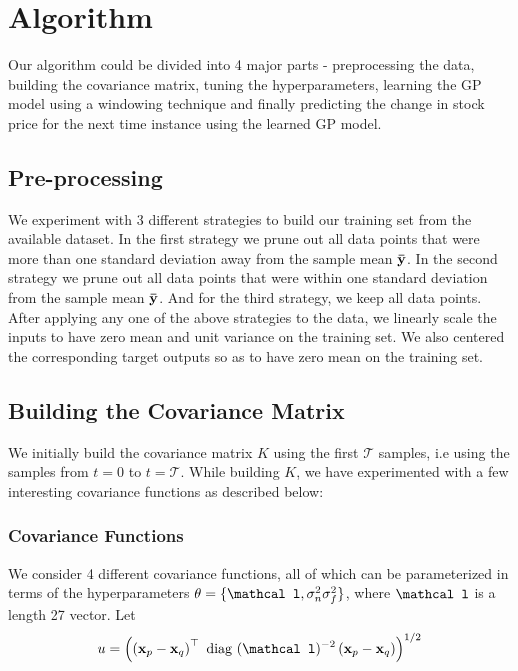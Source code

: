 \documentclass{article} %
\def\bfx{\mathbf x}
\def\bftheta{\mathbf \theta}
\def\bfl{\mathbf \mathcal l}
\def\diag{\mbox{ diag }}
\begin{document}



\section{Algorithm}

Our algorithm could be divided into 4 major parts - preprocessing the data, building the covariance matrix, tuning the hyperparameters, learning the GP model using a windowing technique and finally predicting the change in stock price for the next time instance using the learned GP model. 

\subsection{Pre-processing}

We experiment with 3 different strategies to build our training set from the available dataset. In the first strategy we prune out all data points that were more than one standard deviation away from the sample mean $\bf\bar{y}$. In the second strategy we prune out all data points that were within one standard deviation from the sample mean $\bf\bar{y}$. And for the third strategy, we keep all data points. After applying any one of the above strategies to the data, we linearly scale the inputs to have zero mean and unit variance on the training set. We also centered the corresponding target outputs so as to have zero mean on the training set.

\subsection{Building the Covariance Matrix}

We initially build the covariance matrix $K$ using the first $\mathcal{T}$ samples, i.e using the samples from $t = 0$ to $t = \mathcal{T}$. While building $K$, we have experimented with a few interesting covariance functions as described below:  

\subsubsection{Covariance Functions}
We consider 4 different covariance functions, all of which can be parameterized in terms of the hyperparameters $\bftheta = \{\bfl, \sigma_n^2 \sigma_f^2\}$, where $\bfl$ is a length 27 vector.
Let
\begin{equation}
	u = \left( \left( \bfx_p - \bfx_q \right)^\top \diag(\bfl)^{-2} \left( \bfx_p - \bfx_q \right) \right)^{1/2}
\end{equation}
\end{document}
